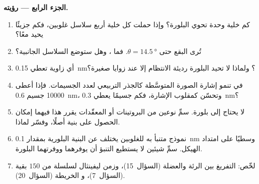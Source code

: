 \begin{problem}
\medskip
\noindent\textbf{الجزء الرابع --- رؤيته.}
\begin{enumerate}[resume]
  \item كم خلية وحدة تحوي البلورة؟ وإذا حملت كل خلية
        أربع سلاسل غلوبين، فكم جزيئًا يحيد معًا؟
  \item تُرى البقع حتى $\theta = \qty{14.5}{\degree}$. فما
        ، وهل ستوضع السلاسل الجانبية؟
  \item أي زاوية تعطي \qty{0.15}{nm}؟ ولماذا لا تحيد البلورة
        رديئة الانتظام إلا عند زوايا صغيرة؟
  \item في  تنمو إشارة الصورة المتوسَّطة
        كالجذر التربيعي لعدد الجسيمات. فإذا أعطى
        \num{10000} جسيم \qty{0.6}{nm}، وتحسّن 
        كمقلوب الإشارة، فكم جسيمًا يعطي
        \qty{0.3}{nm}؟
  \item لا يحتاج  إلى بلورة. سمِّ نوعين من
        البروتينات أو المعقّدات يقرر هذا فيهما إمكان الحصول على بنية
        أصلًا، وفسّر لماذا.
  \item نموذج متنبأ به للغلوبين يختلف عن البنية البلورية
        بمقدار \qty{0.1}{nm} وسطيًا على امتداد الهيكل. سمِّ
        شيئين لا يستطيع التنبؤ أن يوفرهما ووفرتهما البلورة.
  \item لخّص: التفريغ بين الرئة والعضلة (السؤال~15)،
        وزمن ليفينثال لسلسلة من $150$ بقية (السؤال~7)، و
         الخريطة (السؤال~20).
\end{enumerate}
\end{problem}
